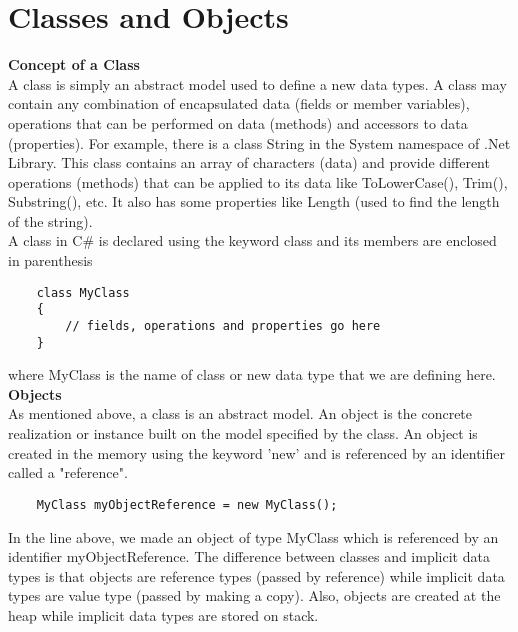 \section{Classes and Objects}

\textbf{Concept of a Class}\\

A class is simply an abstract model used to define a new data types. A class may contain any combination of
encapsulated data (fields or member variables), operations that can be performed on data (methods) and accessors
to data (properties). For example, there is a class String in the System namespace of .Net Library. This class contains an array of characters (data) and provide different operations (methods) that can be
applied to its data like ToLowerCase(), Trim(), Substring(), etc. It also has some properties like Length (used to
find the length of the string).\\

A class in C\# is declared using the keyword class and its members are enclosed in parenthesis

\begin{lstlisting}
    class MyClass
    {
        // fields, operations and properties go here
    }    
\end{lstlisting}

where MyClass is the name of class or new data type that we are defining here.\\

\textbf{Objects}\\

As mentioned above, a class is an abstract model. An object is the concrete realization or instance built on the
model specified by the class. An object is created in the memory using the keyword ’new’ and is referenced by an
identifier called a "reference".

\begin{lstlisting}
    MyClass myObjectReference = new MyClass();    
\end{lstlisting}

In the line above, we made an object of type MyClass which is referenced by an identifier myObjectReference.
The difference between classes and implicit data types is that objects are reference types (passed by reference)
while implicit data types are value type (passed by making a copy). Also, objects are created at the heap while
implicit data types are stored on stack.\\

